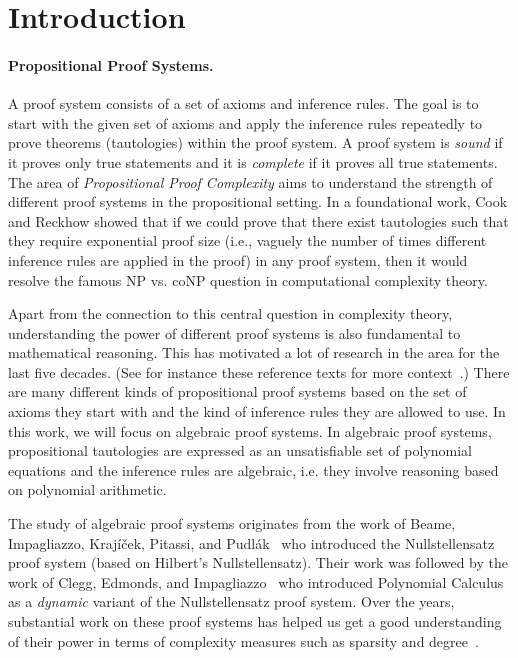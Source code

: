 \documentclass[11pt]{article}
\begin{document}
        \newpage 
        
\tableofcontents

        \newpage


\section{Introduction}
\label{sec:intro}
\paragraph{Propositional Proof Systems.} A proof system consists of a set of axioms and inference rules. The goal is to start with the given set of axioms and apply the inference rules repeatedly to prove theorems (tautologies) within the proof system.  A proof system is \emph{sound} if it proves only true statements and it is \emph{complete} if it proves all true statements. The area of \emph{Propositional Proof Complexity} aims to understand the strength of different proof systems in the propositional setting. In a foundational work, Cook and Reckhow \cite{CR79} showed that if we could prove that there exist tautologies such that they require exponential proof size (i.e., vaguely the number of times different inference rules are applied in the proof) in any proof system, then it would resolve the famous NP vs. coNP question in computational complexity theory. 



Apart from the connection to this central question in complexity theory, understanding the power of different proof systems is also fundamental to mathematical reasoning. This has motivated a lot of research in the area for the last five decades. (See for instance these reference texts for more context~\cite{krabook95,CloteKSurvey02,krabook2019}.) There are many different kinds of propositional proof systems based on the set of axioms they start with and the kind of inference rules they are allowed to use. In this work, we will focus on algebraic proof systems. In algebraic proof systems, propositional tautologies are expressed as an unsatisfiable set of polynomial equations and the inference rules are algebraic, i.e. they involve reasoning based on polynomial arithmetic.

The study of algebraic proof systems originates from the work of Beame, Impagliazzo, Kraj\'{i}\v{c}ek, Pitassi, and Pudl\'{a}k~\cite{BIKPP94}  who introduced the Nullstellensatz proof system (based on Hilbert's Nullstellensatz). Their work was followed by the work of Clegg, Edmonds, and Impagliazzo~\cite{CEI96} who introduced Polynomial Calculus as a \emph{dynamic} variant of the Nullstellensatz proof system. Over the years, substantial work on these proof systems has helped us get a good understanding of their power in terms of complexity measures such as sparsity and degree~\cite{BIKPP94,BIPRS97,Razborov98,Grigoriev98,IPS99,BGIP01,AR2001}. 
\end{document}
